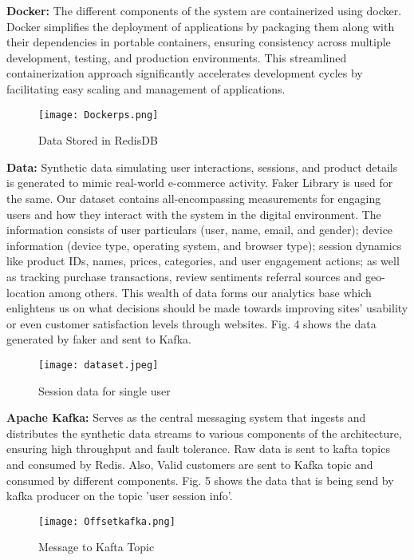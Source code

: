 \documentclass[conference]{IEEEtran}
\begin{document}
\textbf{Docker:} The different components of the system are containerized using docker. Docker simplifies the deployment of applications by packaging them along with their dependencies in portable containers, ensuring consistency across multiple development, testing, and production environments. This streamlined containerization approach significantly accelerates development cycles by facilitating easy scaling and management of applications.
\begin{figure}[htbp]
\centerline{\texttt{[image: Dockerps.png]}}
\caption{Data Stored in RedisDB}
\label{fig}
\end{figure}

\textbf{Data:} Synthetic data simulating user interactions, sessions, and product details is generated to mimic real-world e-commerce activity. Faker Library is used for the same. Our dataset contains all-encompassing measurements for engaging users and how they interact with the system in the digital environment. The information consists of user particulars (user, name, email, and gender); device information (device type, operating system, and browser type); session dynamics like product IDs, names, prices, categories, and user engagement actions; as well as tracking purchase transactions, review sentiments referral sources and geo-location among others. This wealth of data forms our analytics base which enlightens us on what decisions should be made towards improving sites’ usability or even customer satisfaction levels through websites. Fig. 4 shows the data generated by faker and sent to Kafka.
\begin{figure}[htbp]
\centerline{\texttt{[image: dataset.jpeg]}}
\caption{Session data for single user}
\label{fig}
\end{figure}

\textbf{Apache Kafka:} Serves as the central messaging system that ingests and distributes the synthetic data streams to various components of the architecture, ensuring high throughput and fault tolerance. Raw data is sent to kafta topics and consumed by Redis. Also, Valid customers are sent to Kafka topic and consumed by different components. Fig. 5 shows the data that is being send by kafka producer on the topic 'user session info'.

\begin{figure}[htbp]
\centerline{\texttt{[image: Offsetkafka.png]}}
\caption{Message to Kafta Topic}
\label{fig}
\end{figure}
\end{document}
